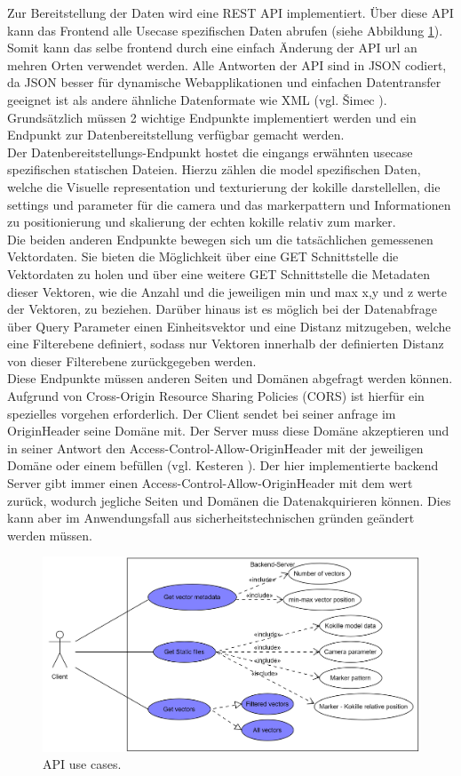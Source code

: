 Zur Bereitstellung der Daten wird eine REST API implementiert. Über diese API kann das 
Frontend alle Usecase spezifischen Daten abrufen (siehe Abbildung \ref{fig:backendUseCase}). Somit kann das selbe frontend durch eine einfach Änderung der API url an mehren Orten verwendet werden. Alle Antworten der API sind in JSON codiert, da JSON besser für dynamische Webapplikationen und einfachen Datentransfer geeignet ist als andere ähnliche Datenformate wie XML (vgl. Šimec \cite{comparisonJsonXml}).
Grundsätzlich müssen 2 wichtige Endpunkte implementiert werden und ein Endpunkt zur Datenbereitstellung verfügbar gemacht werden.\\
Der Datenbereitstellungs-Endpunkt hostet die eingangs erwähnten usecase spezifischen statischen Dateien. Hierzu zählen die model spezifischen Daten, welche die Visuelle representation und texturierung der kokille darstellellen, die settings und parameter für die camera und das markerpattern und Informationen zu positionierung und skalierung der echten kokille relativ zum marker.\\
Die beiden anderen Endpunkte bewegen sich um die tatsächlichen gemessenen Vektordaten. Sie bieten die Möglichkeit über eine GET Schnittstelle die Vektordaten zu holen und über eine weitere GET Schnittstelle die Metadaten dieser Vektoren, wie die Anzahl und die jeweiligen min und max x,y und z werte der Vektoren, zu beziehen. Darüber hinaus ist es möglich bei der Datenabfrage über Query Parameter einen Einheitsvektor und eine Distanz mitzugeben, welche eine Filterebene definiert, sodass nur Vektoren innerhalb der definierten Distanz von dieser Filterebene zurückgegeben werden.\\
Diese Endpunkte müssen anderen Seiten und Domänen abgefragt werden können. Aufgrund von Cross-Origin Resource Sharing Policies (CORS) ist hierfür ein spezielles vorgehen erforderlich. Der Client sendet bei seiner anfrage im \grqq Origin\grqq\space Header seine Domäne mit. Der Server muss diese Domäne akzeptieren und in seiner Antwort den \grqq Access-Control-Allow-Origin\grqq\space Header mit der jeweiligen Domäne oder einem \grqq *\grqq\space befüllen (vgl. Kesteren \cite{van2014cross}). Der hier implementierte backend Server gibt immer einen \grqq Access-Control-Allow-Origin\grqq\space Header mit dem wert \grqq *\grqq\space zurück, wodurch jegliche Seiten und Domänen die Datenakquirieren können. Dies kann aber im Anwendungsfall aus sicherheitstechnischen gründen geändert werden müssen.

\begin{figure}
	\centering
	\includegraphics[width=.75\linewidth]{images/backend/APIUseCases}
	\caption{API use cases.}
	\label{fig:backendUseCase}
\end{figure}


